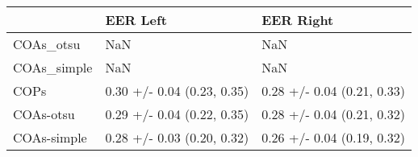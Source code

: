 \begin{tabular}{lll}
\toprule
{} &                    EER Left &                   EER Right \\
\midrule
COAs\_otsu   &                         NaN &                         NaN \\
COAs\_simple &                         NaN &                         NaN \\
COPs        &  0.30 +/- 0.04 (0.23, 0.35) &  0.28 +/- 0.04 (0.21, 0.33) \\
COAs-otsu   &  0.29 +/- 0.04 (0.22, 0.35) &  0.28 +/- 0.04 (0.21, 0.32) \\
COAs-simple &  0.28 +/- 0.03 (0.20, 0.32) &  0.26 +/- 0.04 (0.19, 0.32) \\
\bottomrule
\end{tabular}
